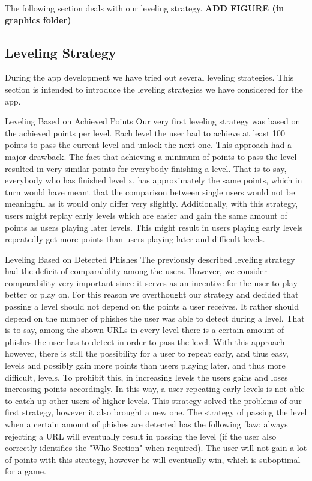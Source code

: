 The following section deals with our leveling strategy.
\textbf{ADD FIGURE (in graphics folder)}
\subsection{Leveling Strategy}
During the app development we have tried out several leveling strategies. This section is intended to introduce the leveling strategies we have considered for the app.

\begin{description}[marginleft=0cm]
	\item{Leveling Based on Achieved Points} Our very first leveling strategy was based on the achieved points per level. Each level the user had to achieve at least 100 points to pass the current level and unlock the next one. This approach had a major drawback. The fact that achieving a minimum of points to pass the level resulted in very similar points for everybody finishing a level. That is to say, everybody who has finished level x, has approximately the same points, which in turn would have meant that the comparison between single users would not be meaningful as it would only differ very slightly. Additionally, with this strategy, users might replay early levels which are easier and gain the same amount of points as users playing later levels. This might result in users playing early levels repeatedly get more points than users playing later and difficult levels.
	\item{Leveling Based on Detected Phishes} The previously described leveling strategy had the deficit of comparability among the users. However, we consider comparability very important  since it serves as an incentive for the user to play better or play on. For this reason we overthought our strategy and decided that passing a level should not depend on the points a user receives. It rather should depend on the number of phishes the user was able to detect during a level. That is to say, among the shown URLs in every level there is a certain amount of phishes the user has to detect in order to pass the level. With this approach however, there is still the possibility for a user to repeat early, and thus easy, levels and possibly gain more points than users playing later, and thus more difficult, levels. To prohibit this, in increasing levels the users gains and loses increasing points accordingly. In this way, a user repeating early levels is not able to catch up other users of higher levels. This strategy solved the problems of our first strategy, however it also brought a new one. The strategy of passing the level when a certain amount of phishes are detected has the following flaw: always rejecting a URL will eventually result in passing the level (if the user also correctly identifies the "Who-Section" when required). The user will not gain a lot of points with this strategy, however he will eventually win, which is suboptimal for a game.  

\end{description}
